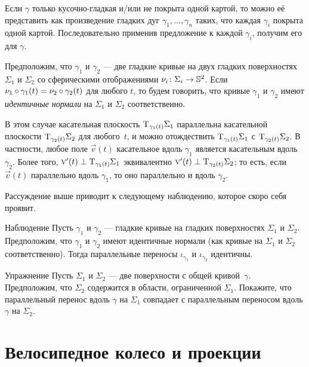 Если $\gamma$ только кусочно-гладкая и/или не покрыта одной картой, то можно её представить как произведение гладких дуг $\gamma_1,\dots,\gamma_n$ таких, что каждая $\gamma_i$ покрыта одной картой.
Последовательно применив предложение к каждой $\gamma_i$, получим его для $\gamma$.
\qeds


Предположим, что $\gamma_1$ и $\gamma_2$ --- две гладкие кривые на двух гладких поверхностях $\Sigma_1$ и $\Sigma_2$ со сферическими отображениями $\nu_i\colon\Sigma_i\to\mathbb{S}^2$.
Если $\nu_1\circ\gamma_1(t)= \nu_2\circ\gamma_2(t)$ для любого $t$, то будем говорить, что кривые $\gamma_1$ и $\gamma_2$ имеют \emph{идентичные нормали} на $\Sigma_1$ и $\Sigma_2$ соответственно.

В этом случае касательная плоскость $\mathrm{T}_{\gamma_1(t)}\Sigma_1$ параллельна касательной плоскости $\mathrm{T}_{\gamma_2(t)}\Sigma_2$ для любого~$t$, и можно отождествить $\mathrm{T}_{\gamma_1(t)}\Sigma_1$ с $\mathrm{T}_{\gamma_2(t)}\Sigma_2$.
В частности, любое поле $\vec v(t)$ касательное вдоль $\gamma_1$ является
касательным вдоль $\gamma_2$.
Более того, $\text{\sc{v}}'(t)\perp \mathrm{T}_{\gamma_1(t)}\Sigma_1$ эквивалентно $\text{\sc{v}}'(t)\perp \mathrm{T}_{\gamma_2(t)}\Sigma_2$; то есть, если $\vec v(t)$ параллельно вдоль $\gamma_1$,
то оно параллельно и вдоль $\gamma_2$.

Рассуждение выше приводит к следующему наблюдению, которое скоро себя проявит.

\begin{thm}{Наблюдение}\label{obs:parallel=}
Пусть $\gamma_1$ и $\gamma_2$ --- гладкие кривые на гладких поверхностях $\Sigma_1$ и $\Sigma_2$.
Предположим, что $\gamma_1$ и $\gamma_2$ имеют идентичные нормали (как кривые на $\Sigma_1$ и $\Sigma_2$ соответственно).
Тогда параллельные переносы $\iota_{\gamma_1}$ и $\iota_{\gamma_2}$ идентичны. 
\end{thm}

\begin{thm}{Упражнение}\label{ex:parallel-transport-support}
Пусть $\Sigma_1$ и $\Sigma_2$ --- две поверхности с общей кривой~$\gamma$.
Предположим, что $\Sigma_2$ содержится в области, ограниченной $\Sigma_1$.
Покажите, что параллельный перенос вдоль $\gamma$ на $\Sigma_1$ 
совпадает с параллельным переносом вдоль $\gamma$ на $\Sigma_2$. 
\end{thm}


\section{Велосипедное колесо и проекции}

